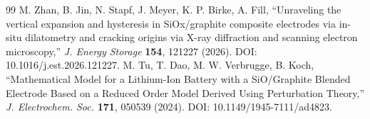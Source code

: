 \begin{thebibliography}{99}
 M. Zhan, B. Jin, N. Stapf, J. Meyer, K. P. Birke, A. Fill, ``Unraveling the vertical expansion and hysteresis in SiOx/graphite composite electrodes via in-situ dilatometry and cracking origins via X-ray diffraction and scanning electron microscopy,'' \emph{J. Energy Storage} \textbf{154}, 121227 (2026). DOI: 10.1016/j.est.2026.121227.
 M. Tu, T. Dao, M. W. Verbrugge, B. Koch, ``Mathematical Model for a Lithium-Ion Battery with a SiO/Graphite Blended Electrode Based on a Reduced Order Model Derived Using Perturbation Theory,'' \emph{J. Electrochem. Soc.} \textbf{171}, 050539 (2024). DOI: 10.1149/1945-7111/ad4823.
\end{thebibliography}
